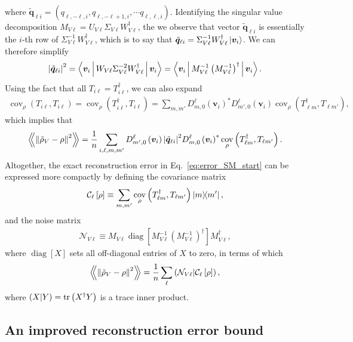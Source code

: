 \documentclass[notitlepage,twocolumn]{revtex4-2}
\newcommand{\f}[2]{\dfrac{#1}{#2}} %
\newcommand{\p}[1]{\left(#1\right)} %
\renewcommand{\sp}[1]{\left[#1\right]} %
\newcommand{\bk}{\Braket} %
\renewcommand{\v}{\bm} %
\newcommand{\Bbk}[1]
{\left\langle\!\!\left\langle #1 \right\rangle\!\!\right\rangle}
\newcommand{\C}{\mathcal{C}}
\newcommand{\N}{\mathcal{N}}
\def\obk#1{\mathinner{({#1})}}
\DeclareMathOperator{\cov}{cov}
\DeclareMathOperator{\diag}{diag}
\newcommand{\1}{\mathds{1}}
\begin{document}
where $\tilde{\v q}_{\ell i} = (q_{\ell,-\ell,i},q_{\ell,-\ell+1,i},\cdots q_{\ell,\ell,i})$.
Identifying the singular value decomposition $M_{V\ell} = U_{V\ell} \Sigma_{V\ell} W_{V\ell}^\dag$, the we observe that vector $\tilde{\v q}_{\ell i}$ is essentially the $i$-th row of $\Sigma_{V\ell}^{-1} W_{V\ell}^\dag$, which is to say that $\tilde{\v q}_{\ell i} = \Sigma_{V\ell}^{-1} W_{V\ell}^\dag \ket{\v v_i}$.
We can therefore simplify
\begin{align}
  \abs{\tilde{\v q}_{\ell i}}^2
  = \bk{\v v_i | W_{V\ell} \Sigma_{V\ell}^{-2} W_{V\ell}^\dag | \v v_i}
  = \bk{\v v_i| M_{V\ell}^{-1} \p{M_{V\ell}^{-1}}^\dag | \v v_i}.
\end{align}
Using the fact that all $T_{i\ell}=T_{i\ell}^\dag$, we can also expand
\begin{align}
  \cov_\rho\p{T_{i\ell},T_{i\ell}}
  = \cov_\rho\p{T_{i\ell}^\dag,T_{i\ell}}
  = \sum_{m,m'} D^\ell_{m,0}\p{\v v_i}^* D^\ell_{m',0}\p{\v v_i}
  \cov_\rho\p{T_{\ell m}^\dag, T_{\ell m'}},
\end{align}
which implies that
\begin{align}
  \Bbk{\norm{\tilde\rho_V-\rho}^2}
  = \f1n \sum_{i,\ell,m,m'}
  D^\ell_{m',0}\p{\v v_i} \abs{\tilde{\v q}_{\ell i}}^2
  D^\ell_{m,0}\p{\v v_i}^*
  \cov_\rho\p{T_{\ell m}^\dag, T_{\ell m'}}.
\end{align}
Altogether, the exact reconstruction error in Eq.~\eqref{eq:error_SM_start} can be expressed more compactly by defining the covariance matrix
\begin{align}
  \C_\ell\sp{\rho} \equiv
  \sum_{m,m'} \cov_\rho\p{T_{\ell m}^\dag, T_{\ell m'}} \op{m}{m'},
\end{align}
and the noise matrix
\begin{align}
  \N_{V\ell} \equiv M_{V\ell} \diag\sp{M_{V\ell}^{-1}
    \p{M_{V\ell}^{-1}}^\dag} M_{V\ell}^\dag,
\end{align}
where $\diag\sp{X}$ sets all off-diagonal entries of $X$ to zero, in terms of which
\begin{align}
  \Bbk{\norm{\tilde\rho_V-\rho}^2}
  = \f1n \sum_\ell \obk{\N_{V\ell}|\C_\ell\sp{\rho}},
  \label{eq:error_SM}
\end{align}
where $\obk{X|Y}=\tr\p{X^\dag Y}$ is a trace inner product.

\subsection{An improved reconstruction error bound}
\end{document}
